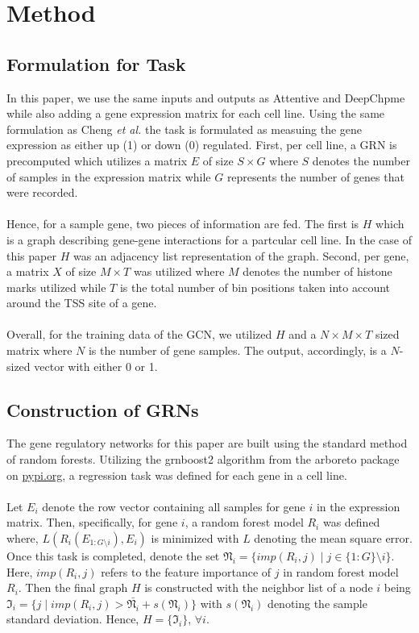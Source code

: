 \section{Method}
\subsection{Formulation for Task} 
In this paper, we use the same inputs and outputs as Attentive and DeepChpme while also adding a gene expression matrix for each cell line. Using the same formulation as Cheng \emph{et al.} the task is formulated as measuing the gene expression as either up (1) or down (0) regulated. First, per cell line, a GRN is precomputed which utilizes a matrix $E$ of size $S\times G$ where $S$ denotes the number of samples in the expression matrix while $G$ represents the number of genes that were recorded. \\\\
Hence, for a sample gene, two pieces of information are fed. The first is $H$ which is a graph describing gene-gene interactions for a partcular cell line. In the case of this paper $H$ was an adjacency list representation of the graph. Second, per gene, a matrix $X$ of size $M\times T$ was utilized where $M$ denotes the number of histone marks utilized while $T$ is the total number of bin positions taken into account around the TSS site of a gene. \\\\
Overall, for the training data of the GCN, we utilized $H$ and a $N\times M\times T$ sized matrix where $N$ is the number of gene samples. The output, accordingly, is a $N$-sized vector with either 0 or 1.

\subsection{Construction of GRNs}
The gene regulatory networks for this paper are built using the standard method of random forests. Utilizing the grnboost2 algorithm from the arboreto package on \url{pypi.org}, a regression task was defined for each gene in a cell line. \\\\
Let $E_i$ denote the row vector containing all samples for gene $i$ in the expression matrix. Then, specifically, for gene $i$, a random forest model $R_i$ was defined where, $L(R_i(E_{1:G\setminus i}), E_i)$ is minimized with $L$ denoting the mean square error. Once this task is completed, denote the set $\mathfrak{N}_i = \{imp(R_i, j) \mid j \in \{1:G\}\setminus i\}$. Here, $imp(R_i, j)$ refers to the feature importance of $j$ in random forest model $R_i$. Then the final graph $H$ is constructed with the neighbor list of a node $i$ being $\mathfrak{I}_i = \{j \mid imp(R_i, j) > \bar{\mathfrak{N}_i} + s(\mathfrak{N}_i)\}$ with $s(\mathfrak{N}_i)$ denoting the sample standard deviation. Hence, $H = \{\mathfrak{I}_i\}$, $\forall i$.
